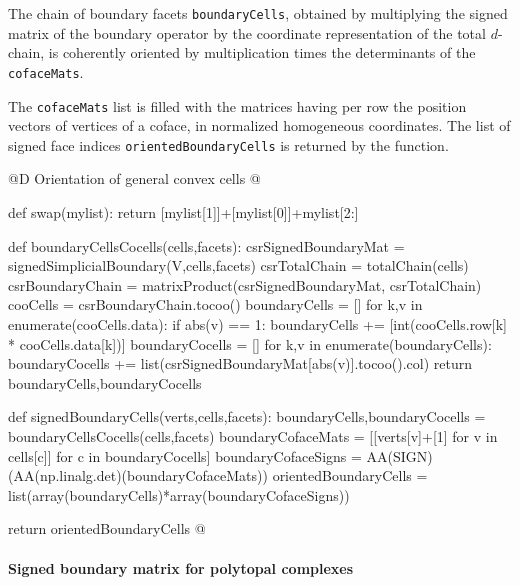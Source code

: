 \documentclass[11pt,oneside]{article}    %
\begin{document}
The chain of boundary facets \texttt{boundaryCells}, obtained by multiplying the signed matrix of the boundary operator by the coordinate representation of the total $d$-chain, is coherently oriented by multiplication times the determinants of the \texttt{cofaceMats}.

The \texttt{cofaceMats} list is filled 
with the matrices having per row the position vectors of vertices of a coface, in normalized 
homogeneous coordinates. The list of signed face indices \texttt{orientedBoundaryCells} is returned by the function.

@D Orientation of general convex cells
@{def swap(mylist): return [mylist[1]]+[mylist[0]]+mylist[2:]

def boundaryCellsCocells(cells,facets):
    csrSignedBoundaryMat = signedSimplicialBoundary(V,cells,facets)
    csrTotalChain = totalChain(cells)
    csrBoundaryChain = matrixProduct(csrSignedBoundaryMat, csrTotalChain)
    cooCells = csrBoundaryChain.tocoo()    
    boundaryCells = []
    for k,v in enumerate(cooCells.data):
        if abs(v) == 1:
            boundaryCells += [int(cooCells.row[k] * cooCells.data[k])]            
    boundaryCocells = []
    for k,v in enumerate(boundaryCells):
        boundaryCocells += list(csrSignedBoundaryMat[abs(v)].tocoo().col)        
    return boundaryCells,boundaryCocells

def signedBoundaryCells(verts,cells,facets):
    boundaryCells,boundaryCocells = boundaryCellsCocells(cells,facets)        
    boundaryCofaceMats = [[verts[v]+[1] for v in cells[c]] for c in boundaryCocells]
    boundaryCofaceSigns = AA(SIGN)(AA(np.linalg.det)(boundaryCofaceMats))
    orientedBoundaryCells = list(array(boundaryCells)*array(boundaryCofaceSigns))
    
    return orientedBoundaryCells
@}

\paragraph{Signed boundary matrix for polytopal complexes}
\end{document}
